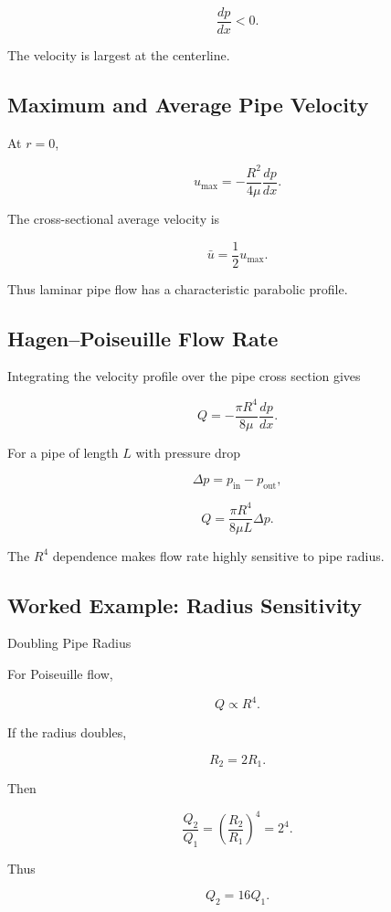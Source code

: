 \[
\frac{dp}{dx}<0.
\]

The velocity is largest at the centerline.

\subsection{Maximum and Average Pipe Velocity}
\label{subsec:pipe-average-velocity}

At \(r=0\),

\[
\boxed{
u_{\max}
=
-\frac{R^2}{4\mu}
\frac{dp}{dx}.
}
\]

The cross-sectional average velocity is

\[
\boxed{
\bar u
=
\frac12u_{\max}.
}
\]

Thus laminar pipe flow has a characteristic parabolic profile.

\subsection{Hagen--Poiseuille Flow Rate}
\label{subsec:hagen-poiseuille-law}

Integrating the velocity profile over the pipe cross section gives

\[
\boxed{
Q
=
-\frac{\pi R^4}{8\mu}
\frac{dp}{dx}.
}
\]

For a pipe of length \(L\) with pressure drop

\[
\Delta p
=
p_{\text{in}}-p_{\text{out}},
\]

\[
\boxed{
Q
=
\frac{\pi R^4}{8\mu L}
\Delta p.
}
\]

The \(R^4\) dependence makes flow rate highly sensitive to pipe radius.

\subsection{Worked Example: Radius Sensitivity}
\label{subsec:worked-radius-sensitivity}

\begin{workedexamplebox}{Doubling Pipe Radius}

For Poiseuille flow,

\[
Q
\propto
R^4.
\]

If the radius doubles,

\[
R_2=2R_1.
\]

Then

\[
\frac{Q_2}{Q_1}
=
\left(
\frac{R_2}{R_1}
\right)^4
=
2^4.
\]

Thus

\begin{answerbox}
\[
\boxed{
Q_2=16Q_1.
}
\]
\end{answerbox}

\end{workedexamplebox}

